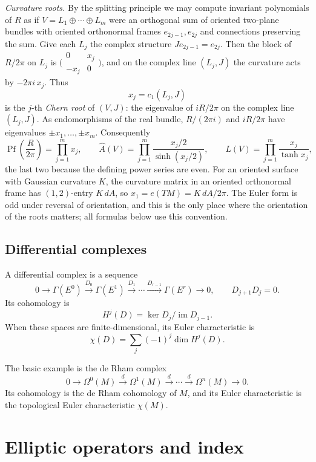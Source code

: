 \documentclass[11pt,oneside,reqno]{book}
\newcommand{\Ahat}{\widehat A}
\theoremstyle{plain}
\theoremstyle{definition}
\theoremstyle{remark}
\begin{document}
\emph{Curvature roots.}  By the splitting principle we may compute
invariant polynomials of \(R\) as if \(V=L_1\oplus\cdots\oplus L_m\) were
an orthogonal sum of oriented two-plane bundles with oriented orthonormal
frames \(e_{2j-1},e_{2j}\) and connections preserving the sum.  Give each
\(L_j\) the complex structure \(J e_{2j-1}=e_{2j}\).  Then the block of
\(R/2\pi\) on \(L_j\) is
\(\bigl(\begin{smallmatrix}0&x_j\\-x_j&0\end{smallmatrix}\bigr)\), and on
the complex line \((L_j,J)\) the curvature acts by \(-2\pi i\,x_j\).  Thus
\[
 x_j=c_1(L_j,J)
\]
is the \(j\)-th \emph{Chern root} of \((V,J)\): the eigenvalue of
\(iR/2\pi\) on the complex line \((L_j,J)\).  As endomorphisms of the real
bundle, \(R/(2\pi i)\) and \(iR/2\pi\) have eigenvalues
\(\pm x_1,\ldots,\pm x_m\).  Consequently
\[
 \operatorname{Pf}\!\left(\frac{R}{2\pi}\right)=\prod_{j=1}^mx_j,
 \qquad
 \Ahat(V)=\prod_{j=1}^m\frac{x_j/2}{\sinh(x_j/2)},
 \qquad
 L(V)=\prod_{j=1}^m\frac{x_j}{\tanh x_j},
\]
the last two because the defining power series are even.  For an oriented
surface with Gaussian curvature \(K\), the curvature matrix in an oriented
orthonormal frame has \((1,2)\)-entry \(K\,dA\), so
\(x_1=e(TM)=K\,dA/2\pi\).  The Euler form is odd under reversal of
orientation, and this is the only place where the orientation of the roots
matters; all formulas below use this convention.

\section{Differential complexes}

A differential complex is a sequence
\[
 0\longrightarrow\Gamma(E^0)
 \xrightarrow{D_0}\Gamma(E^1)
 \xrightarrow{D_1}\cdots
 \xrightarrow{D_{r-1}}\Gamma(E^r)
 \longrightarrow0,
 \qquad D_{j+1}D_j=0.
\]
Its cohomology is
\[
 H^j(D)=\ker D_j/\operatorname{im}D_{j-1}.
\]
When these spaces are finite-dimensional, its Euler characteristic is
\[
 \chi(D)=\sum_j(-1)^j\dim H^j(D).
\]

The basic example is the de Rham complex
\[
 0\longrightarrow\Omega^0(M)
 \xrightarrow{d}\Omega^1(M)
 \xrightarrow{d}\cdots
 \xrightarrow{d}\Omega^n(M)
 \longrightarrow0.
\]
Its cohomology is the de Rham cohomology of \(M\), and its Euler
characteristic is the topological Euler characteristic \(\chi(M)\).


\chapter{Elliptic operators and index}
\end{document}
